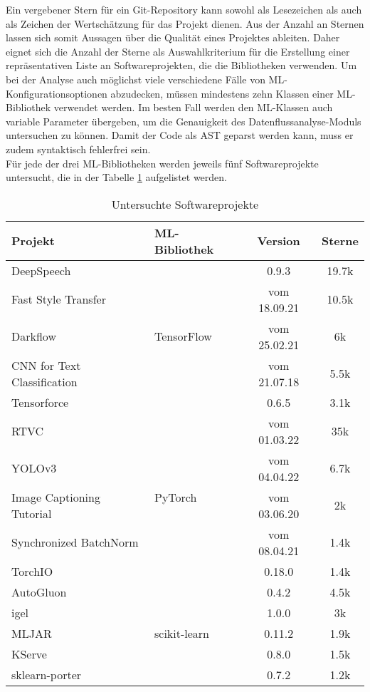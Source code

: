 \documentclass[german,bachelor]{swsLeipzig}
\begin{document}
Ein vergebener Stern für ein Git-Repository kann sowohl als Lesezeichen als auch als Zeichen der Wertschätzung für das Projekt dienen.
Aus der Anzahl an Sternen lassen sich somit Aussagen über die Qualität eines Projektes ableiten.
Daher eignet sich die Anzahl der Sterne als Auswahlkriterium für die Erstellung einer repräsentativen Liste an Softwareprojekten, die die
Bibliotheken verwenden.
Um bei der Analyse auch möglichst viele verschiedene Fälle von ML-Konfigurationsoptionen abzudecken, müssen mindestens zehn
Klassen einer ML-Bibliothek verwendet werden.
Im besten Fall werden den ML-Klassen auch variable Parameter übergeben, um die Genauigkeit des Datenflussanalyse-Moduls
untersuchen zu können.
Damit der Code als AST geparst werden kann, muss er zudem syntaktisch fehlerfrei sein.\\

Für jede der drei ML-Bibliotheken werden jeweils fünf Softwareprojekte untersucht, die in der Tabelle \ref{projekte} aufgelistet
werden.\\

\begin{table}[H]
\small
\begin{center}
\begin{tabular}[h]{l|l|c|c}
\hline
Projekt & ML-Bibliothek & Version & Sterne \\
\hline \hline
DeepSpeech & \multirow{5}{*}{TensorFlow} & 0.9.3 & 19.7k\\
Fast Style Transfer & & vom 18.09.21 & 10.5k \\
Darkflow & & vom 25.02.21 & 6k \\
CNN for Text Classification & & vom 21.07.18 & 5.5k \\
Tensorforce & & 0.6.5 & 3.1k \\
\hline
RTVC & \multirow{5}{*}{PyTorch} & vom 01.03.22 & 35k\\
YOLOv3 & & vom 04.04.22 & 6.7k \\
Image Captioning Tutorial & & vom 03.06.20 & 2k \\
Synchronized BatchNorm & & vom 08.04.21 & 1.4k \\
TorchIO & & 0.18.0 & 1.4k \\
\hline
AutoGluon & \multirow{5}{*}{scikit-learn} & 0.4.2 & 4.5k\\
igel & & 1.0.0 & 3k \\
MLJAR & & 0.11.2 & 1.9k \\
KServe & & 0.8.0 & 1.5k \\
sklearn-porter & & 0.7.2 & 1.2k \\
\hline
\end{tabular}
\caption{Untersuchte Softwareprojekte} \label{projekte}
\end{center}
\end{table}
\end{document}
